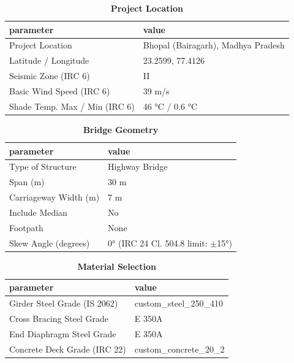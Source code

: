\documentclass[12pt,a4paper]{report}
\numberwithin{table}{chapter}
\numberwithin{figure}{chapter}
\begin{document}
\begin{table}[H]
\caption{\textbf{Project Location}}
\label{subsec:project-location}
\begin{tabular}{|L{5.5cm}|L{8.5cm}|}
\hline
\textbf{parameter} & \textbf{value} \\
\hline
\textnormal{Project Location} & Bhopal (Bairagarh), Madhya Pradesh \\
\hline
\textnormal{Latitude / Longitude} & 23.2599, 77.4126 \\
\hline
\textnormal{Seismic Zone (IRC 6)} & II \\
\hline
\textnormal{Basic Wind Speed (IRC 6)} & 39 m/s \\
\hline
\textnormal{Shade Temp. Max / Min (IRC 6)} & 46 °C / 0.6 °C \\
\hline
\end{tabular}
\vspace{0.4cm}
\end{table}

\begin{table}[H]
\caption{\textbf{Bridge Geometry}}
\label{subsec:bridge-geometry}
\begin{tabular}{|L{5.5cm}|L{8.5cm}|}
\hline
\textbf{parameter} & \textbf{value} \\
\hline
\textnormal{Type of Structure} & Highway Bridge \\
\hline
\textnormal{Span (m)} & 30 m \\
\hline
\textnormal{Carriageway Width (m)} & 7 m \\
\hline
\textnormal{Include Median} & No \\
\hline
\textnormal{Footpath} & None \\
\hline
\textnormal{Skew Angle (degrees)} & 0° (IRC 24 Cl. 504.8 limit: $\pm$15°) \\
\hline
\end{tabular}
\end{table}
\vspace{0.4cm}

\begin{table}[H]
\caption{\textbf{Material Selection}}
\label{subsec:material}
\begin{tabular}{|L{5.5cm}|L{8.5cm}|}
\hline
\textbf{parameter} & \textbf{value} \\
\hline
\textnormal{Girder Steel Grade (IS 2062)} & custom\_\allowbreak{}steel\_\allowbreak{}250\_\allowbreak{}410 \\
\hline
\textnormal{Cross Bracing Steel Grade} & E 350A \\
\hline
\textnormal{End Diaphragm Steel Grade} & E 350A \\
\hline
\textnormal{Concrete Deck Grade (IRC 22)} & custom\_\allowbreak{}concrete\_\allowbreak{}20\_\allowbreak{}2 \\
\hline
\end{tabular}
\end{table}
\vspace{0.4cm}
\end{document}
